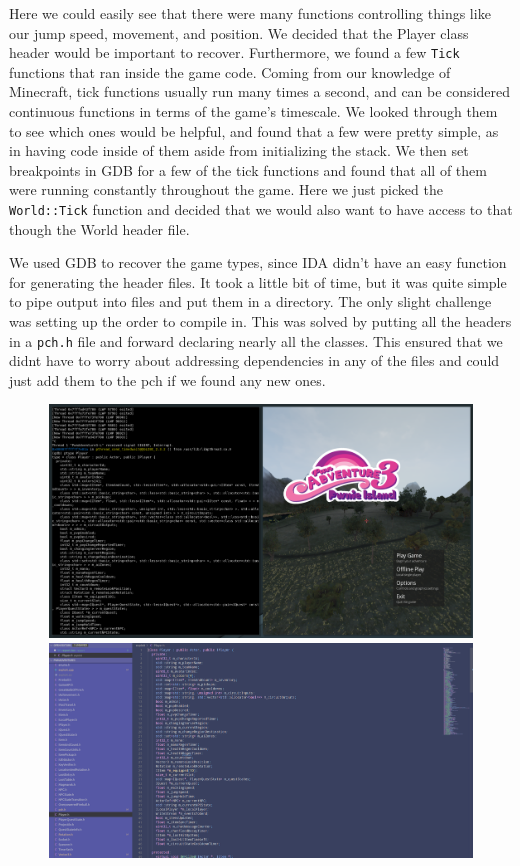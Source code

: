 \documentclass[11pt]{article}
\begin{document}
Here we could easily see that there were many functions controlling things like our jump speed, movement, and position. We decided that the Player class header would be important to recover. Furthermore, we found a few \texttt{Tick} functions that ran inside the game code. Coming from our knowledge of Minecraft, tick functions usually run many times a second, and can be considered continuous functions in terms of the game's timescale. We looked through them to see which ones would be helpful, and found that a few were pretty simple, as in having code inside of them aside from initializing the stack. We then set breakpoints in GDB for a few of the tick functions and found that all of them were running constantly throughout the game. Here we just picked the \texttt{World::Tick} function and decided that we would also want to have access to that though the World header file.

We used GDB to recover the game types, since IDA didn't have an easy function for generating the header files. It took a little bit of time, but it was quite simple to pipe output into files and put them in a directory. The only slight challenge was setting up the order to compile in. This was solved by putting all the headers in a \texttt{pch.h} file and forward declaring nearly all the classes. This ensured that we didnt have to worry about addressing dependencies in any of the files and could just add them to the pch if we found any new ones.
\begin{figure}[H]
    \centering
    \includegraphics[width=1.00\linewidth]{gdb_ptype.png}
    \includegraphics[width=1.00\linewidth]{class_recovery.png}
\end{figure}
\end{document}

